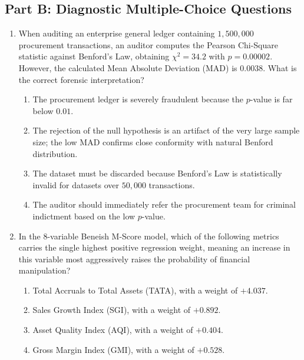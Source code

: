 \subsection*{Part B: Diagnostic Multiple-Choice Questions}

\begin{enumerate}[label=\textbf{MCQ 5.\arabic*}]
    \item When auditing an enterprise general ledger containing $1{,}500{,}000$ procurement transactions, an auditor computes the Pearson Chi-Square statistic against Benford's Law, obtaining $\chi^2 = 34.2$ with $p = 0.00002$. However, the calculated Mean Absolute Deviation (MAD) is $0.0038$. What is the correct forensic interpretation?
    \begin{enumerate}[label=(\alph*)]
        \item The procurement ledger is severely fraudulent because the $p$-value is far below $0.01$.
        \item The rejection of the null hypothesis is an artifact of the very large sample size; the low MAD confirms close conformity with natural Benford distribution.
        \item The dataset must be discarded because Benford's Law is statistically invalid for datasets over $50{,}000$ transactions.
        \item The auditor should immediately refer the procurement team for criminal indictment based on the low $p$-value.
    \end{enumerate}

    \item In the 8-variable Beneish M-Score model, which of the following metrics carries the single highest positive regression weight, meaning an increase in this variable most aggressively raises the probability of financial manipulation?
    \begin{enumerate}[label=(\alph*)]
        \item Total Accruals to Total Assets (TATA), with a weight of $+4.037$.
        \item Sales Growth Index (SGI), with a weight of $+0.892$.
        \item Asset Quality Index (AQI), with a weight of $+0.404$.
        \item Gross Margin Index (GMI), with a weight of $+0.528$.
    \end{enumerate}
\end{enumerate}
